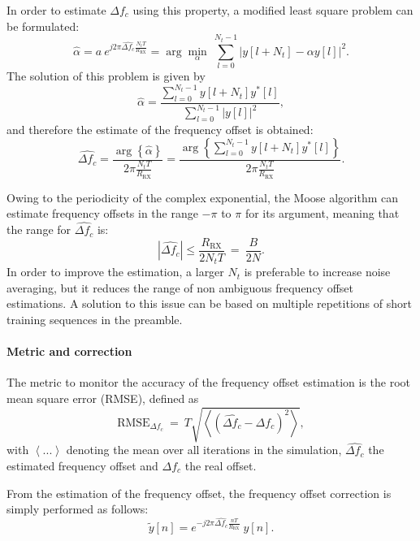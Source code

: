 In order to estimate $\Delta f_c$ using this property, a modified least square problem can be formulated:
\begin{equation*}
    \hat{\alpha} = a \:e^{j2\pi \widehat{\Delta f_c} \frac{N_tT}{R_{\text{RX}}}} = \arg\min_{\alpha} \: \sum_{l=0}^{N_t-1} \left|y[l+N_t] - \alpha y[l]\right|^2.
\end{equation*}
The solution of this problem is given by
\begin{equation*}
    \hat{\alpha} =  \frac{\sum_{l=0}^{N_t-1} y[l+N_t]y^*[l]}{\sum_{l=0}^{N_t-1} |y[l]|^2},
\end{equation*}
and therefore the estimate of the frequency offset is obtained:
\begin{equation*}
     \widehat{\Delta f_c} = \frac{\arg\left\{\hat{\alpha}\right\}}{2 \pi \frac{N_tT}{R_{\text{RX}}}} = \frac{\arg\left\{\sum_{l=0}^{N_t-1} y[l+N_t]y^*[l]\right\}}{2 \pi \frac{N_tT}{R_{\text{RX}}}}.
\end{equation*}

Owing to the periodicity of the complex exponential, the Moose algorithm can estimate frequency offsets in the range $-\pi$ to $\pi$ for its argument, meaning that the range for $\widehat{\Delta f_c}$ is:
\begin{equation*}
    |\widehat{\Delta f_c}| \leq \frac{R_{\text{RX}}}{2N_tT}\:=\:\frac{B}{2N}.
\end{equation*}
In order to improve the estimation, a larger $N_t$ is preferable to increase noise averaging, but it reduces the range of non ambiguous frequency offset estimations. A solution to this issue can be based on multiple repetitions of short training sequences in the preamble.

\paragraph{Metric and correction}
The metric to monitor the accuracy of the frequency offset estimation is the root mean square error (RMSE), defined as
\begin{equation*}
    \text{RMSE}_{\Delta f_c}\:=\:T\sqrt{\left\langle\left(\widehat{\Delta f_c}-\Delta f_c\right)^2\right\rangle},
\end{equation*}
with $\left\langle ... \right\rangle$ denoting the mean over all iterations in the simulation, $\widehat{\Delta f_c}$ the estimated frequency offset and $\Delta f_c$ the real offset.

From the estimation of the frequency offset, the frequency offset correction is simply performed as follows:
\begin{equation*}
    \tilde{y}[n] = e^{-j2\pi \widehat{\Delta f_c} \frac{nT}{R_{\text{RX}}}}\:y[n].
\end{equation*}


